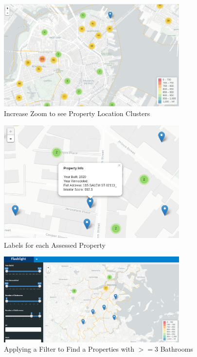 \documentclass[12pt]{article}
\begin{document}
\begin{appendices}
\begin{figure}
  \caption{Increase Zoom to see Property Location Clusters}
  \centering
  \includegraphics[width=0.85\textwidth]{showing_clusters}
\end{figure}

\begin{figure}
  \caption{Labels for each Assessed Property}
  \centering
  \includegraphics[width=0.85\textwidth]{individual_point_label}
\end{figure}

\begin{figure}
  \caption{Applying a Filter to Find a Properties with $>= 3$ Bathrooms}
  \centering
  \includegraphics[width=0.85\textwidth]{bathroom_filter}
\end{figure}



\end{appendices}

 

\end{document}
